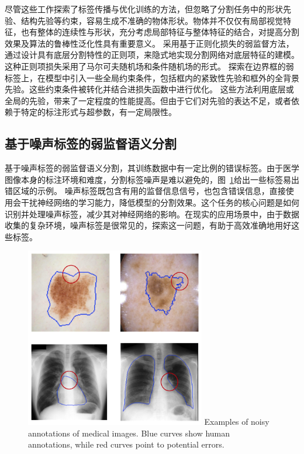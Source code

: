 尽管这些工作探索了标签传播与优化训练的方法，但忽略了分割任务中的形状先验、结构先验等约束，容易生成不准确的物体形状。物体并不仅仅有局部视觉特征，也有整体的连续性与形状，充分考虑局部特征与整体特征的结合，对提高分割效果及算法的鲁棒性泛化性具有重要意义。
\citet{tang2018regularized} 采用基于正则化损失的弱监督方法，通过设计具有底层分割特性的正则项，来隐式地实现分割网络对底层特征的建模。这种正则项损失采用了马尔可夫随机场和条件随机场的形式。
\citet{kervadec2020bounding} 探索在边界框的弱标签上，在模型中引入一些全局约束条件，包括框内的紧致性先验和框外的全背景先验。这些约束条件被转化并结合进损失函数中进行优化。
这些方法利用底层或全局的先验，带来了一定程度的性能提高。但由于它们对先验的表达不足，或者依赖于特定的标注形式与超参数，有一定局限性。


\subsection{基于噪声标签的弱监督语义分割}
基于噪声标签的弱监督语义分割，其训练数据中有一定比例的错误标签。由于医学图像本身的标注环境和难度，分割标签噪声是难以避免的，图~\ref{c1_fig3}给出一些标签易出错区域的示例。
噪声标签既包含有用的监督信息信号，也包含错误信息，直接使用会干扰神经网络的学习能力，降低模型的分割效果。这个任务的核心问题是如何识别并处理噪声标签，减少其对神经网络的影响。在现实的应用场景中，由于数据收集的复杂环境，噪声标签是很常见的，探索这一问题，有助于高效准确地用好这些标签。
    \begin{figure}[t!]
        \centering 
        \includegraphics[width=0.7\textwidth]{img/c1/intro_3.png}
        {Examples of noisy annotations of medical images. Blue curves show human annotations, while red curves point to potential errors.}
        \label{c1_fig3}
    \end{figure}

